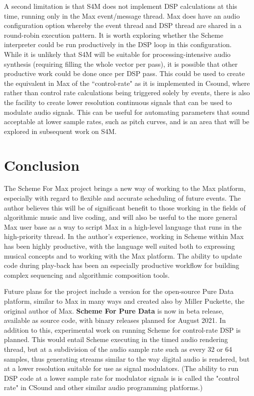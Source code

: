 \documentclass[acmsmall, anonymous, review]{acmart}
\begin{document}
A second limitation is that S4M does not implement DSP calculations at this
time, running only in the Max event/message thread. 
Max does have an audio configuration option
whereby the event thread and DSP thread are shared in a round-robin
execution pattern. It is worth exploring whether the Scheme interpreter
could be run productively in the DSP loop in this configuration. While it is
unlikely that S4M will be suitable for processing-intensive audio synthesis
(requiring filling the whole vector per pass), it is possible that
other productive work could be done once per DSP pass.
This could be used to create the equivalent in Max of the ``control-rate"
as it is implemented in Csound, where rather than control rate calculations being triggered
solely by events, there is also the facility to create lower resolution
continuous signals that can be used to modulate audio signals. 
This can be useful for automating parameters that 
sound acceptable at lower sample rates, such as pitch curves, and is
an area that will be explored in subsequent work on S4M.


\section{Conclusion}
The Scheme For Max project brings a new way of working 
to the Max platform, especially with regard to flexible and accurate 
scheduling of future events.  The author believes this will be
of significant benefit to those working in the fields of algorithmic
music and live coding, and will also be useful to the more general Max 
user base as a way to script Max in a high-level language that runs in
the high-priority thread. In the author's experience, 
working in Scheme within Max has been highly productive, with the
language well suited both to expressing musical concepts and to working
with the Max platform. The ability to update code during play-back
has been an especially productive workflow for building complex 
sequencing and algorithmic composition tools.

Future plans for the project include a version for the open-source
Pure Data platform, similar to Max in many ways and created also by Miller Puckette,
the original author of Max. \textbf{Scheme For Pure Data} is now in beta release, available
as source code, with binary releases planned for August 2021. In addition
to this, experimental work on running Scheme for control-rate DSP is planned.
This would entail Scheme executing in the timed audio rendering thread, but
at a subdivision of the audio sample rate such as every 32 or 64 samples, 
thus generating streams similar to the way digital audio is rendered, but
at a lower resolution suitable for use as signal modulators. (The ability
to run DSP code at a lower sample rate for modulator signals is  
is called the "control rate" in CSound and other similar audio programming platforms.)
\end{document}
